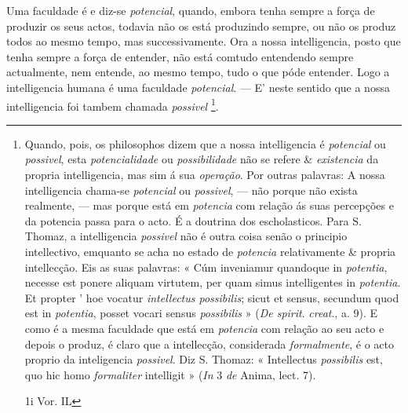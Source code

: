 
    
Uma faculdade é e diz-se \emph{potencial}, quando, embora tenha sempre a força de produzir os seus actos, todavia não os está produzindo sempre, ou não os produz todos ao mesmo tempo, mas successivamente. Ora a nossa intelligencia, posto que tenha sempre a força de entender, não está comtudo entendendo sempre actualmente, nem entende, ao mesmo tempo, tudo o que póde entender. Logo a intelligencia humana é uma faculdade \emph{potencial}. --- E' neste sentido que a nossa intelligencia foi tambem chamada \emph{possivel} \footnote{Quando, pois, os philosophos dizem que a nossa intelligencia é \emph{potencial} ou \emph{possivel}, esta \emph{potencialidade} ou \emph{possibilidade} não se refere \& \emph{existencia} da propria intelligencia, mas sim á sua \emph{operação}. Por outras palavras: A nossa intelligencia chama-se \emph{potencial} ou \emph{possivel}, --- não porque não exista realmente, --- mas porque está em \emph{potencia} com relação ás suas percepções e da potencia passa para o acto. É a doutrina dos escholasticos. Para S. Thomaz, a intelligencia \emph{possivel} não é outra coisa senão o principio intellectivo, emquanto se acha no estado de \emph{potencia} relativamente \& propria intellecção. Eis as suas palavras: « Cúm inveniamur quandoque in \emph{potentia}, necesse est ponere aliquam virtutem, per quam simus intelligentes in \emph{potentia}. Et propter ' hoe vocatur \emph{intellectus possibilis}; sicut et sensus, secundum quod est in \emph{potentia}, posset vocari sensus \emph{possibilis} » (\emph{De spirit}. \emph{creat}., a. 9). E como é a mesma faculdade que está em \emph{potencia} com relação ao seu acto e depois o produz, é claro que a intellecção, considerada \emph{formalmente}, é o acto proprio da inteligencia \emph{possivel}. Diz S. Thomaz: « Intellectus \emph{possibilis} est, quo hic homo \emph{formaliter} intelligit » (\emph{In} 3 \emph{de} Anima, lect. 7).\par 1i Vor. IL}.


